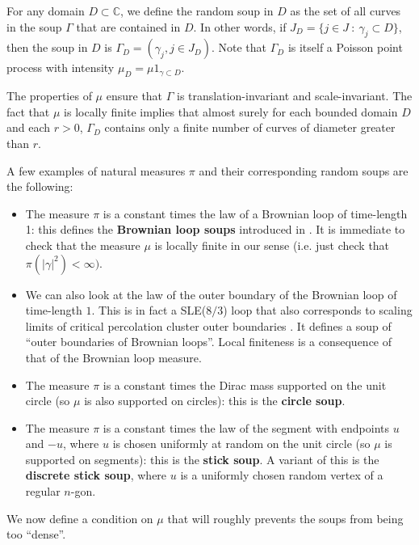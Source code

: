 \documentclass[11pt]{article}
\newcommand{\CC}{{\mathbb C}}
\begin{document}
For any domain $D \subset \CC$, we define the random soup in $D$ as the set
of all curves in the soup $\Gamma$ that are contained in $D$. 
In other words, if $J_D= \{ j \in J \ : \ \gamma_j \subset D \}$, 
then the soup in $D$ is $\Gamma_D= ( \gamma_j, j \in J_D)$. 
Note that $\Gamma_D$ is itself a Poisson point process with intensity 
$\mu_D = \mu 1_{\gamma \subset D}$.

The properties of $\mu$ ensure that $\Gamma$ is 
translation-invariant and scale-invariant. The fact that $\mu$ is locally finite 
implies that almost surely  for each bounded domain $D$ and each $r>0$, $\Gamma_D$ 
contains only a finite number of curves of diameter greater than $r$. 

A few examples of natural measures $\pi$ and their corresponding random soups are the following:
\begin{itemize}
\item The measure  $\pi$ is a constant times the law of a Brownian loop of time-length 1: this defines
the {\bf Brownian loop soups} introduced in \cite {LWls}. 
It is immediate to check that the measure $\mu$ is locally finite 
in our sense (i.e. just check that $\pi ( |\gamma|^2 ) < \infty)$. 
\item
We can also look at the law of the outer boundary of the Brownian loop of time-length $1$. 
This is in fact a SLE($8/3$) loop that also corresponds to scaling limits of 
critical percolation cluster outer boundaries \cite {Wsal}.
It defines a soup of ``outer boundaries of Brownian loops''. 
Local finiteness is a consequence of that of the Brownian loop measure.

\item The measure $\pi$ is a constant times the Dirac mass supported on the unit circle
(so $\mu$ is also supported on circles): this is the {\bf circle soup}.

\item The measure $\pi$ is a constant times the law of the segment with endpoints $u$ and $-u$,
where $u$ is chosen uniformly at random on the unit circle (so $\mu$ is supported
on segments): this is the {\bf stick soup}. A variant of this is the
{\bf discrete stick soup}, where $u$ is a uniformly chosen random vertex of
a regular $n$-gon.
\end{itemize}


We now define a condition on $\mu$ that will roughly prevents the soups from being too ``dense''.
\end{document}

